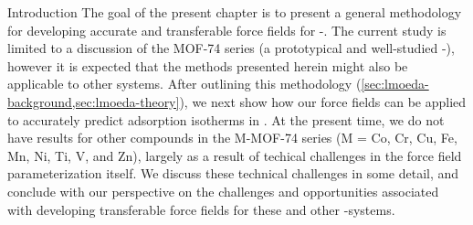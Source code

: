 \begin{section}{Introduction}
The goal of the present chapter is to present a general 
methodology for developing accurate and transferable force fields for \cus-\mofs. 
The current study is limited to a discussion of the MOF-74 series (a
prototypical and well-studied \cus-\mof), however it
is expected that the methods presented herein might also be applicable to
other systems. After outlining this methodology
(\cref{sec:lmoeda-background,sec:lmoeda-theory}), we next show how our force
fields can be applied to accurately predict \co adsorption isotherms in
\mgmof. At the present time, we do not have results for other compounds in the
M-MOF-74 series (M = Co, Cr, Cu, Fe, Mn, Ni, Ti, V, and Zn), largely as a
result of techical challenges in the force field parameterization itself.
We discuss these technical challenges in some detail, and conclude with our
perspective on the challenges and opportunities associated with developing
transferable force fields for these and other \cus-\mof systems.



\end{section}





